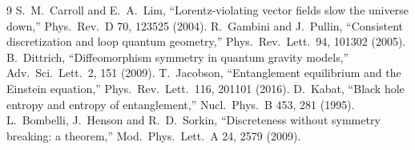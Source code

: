 \documentclass[11pt]{article}
\begin{document}
\begin{thebibliography}{9}
 S.~M.~Carroll and E.~A.~Lim, ``Lorentz-violating vector fields slow the universe down,'' Phys.\ Rev.\ D 70, 123525 (2004).
 R.~Gambini and J.~Pullin, ``Consistent discretization and loop quantum geometry,'' Phys.\ Rev.\ Lett.\ 94, 101302 (2005).
 B.~Dittrich, ``Diffeomorphism symmetry in quantum gravity models,'' Adv.\ Sci.\ Lett.\ 2, 151 (2009).
 T.~Jacobson, ``Entanglement equilibrium and the Einstein equation,'' Phys.\ Rev.\ Lett.\ 116, 201101 (2016).
 D.~Kabat, ``Black hole entropy and entropy of entanglement,'' Nucl.\ Phys.\ B 453, 281 (1995).
 L.~Bombelli, J.~Henson and R.~D.~Sorkin, ``Discreteness without symmetry breaking: a theorem,'' Mod.\ Phys.\ Lett.\ A 24, 2579 (2009).
\end{thebibliography}
\end{document}
